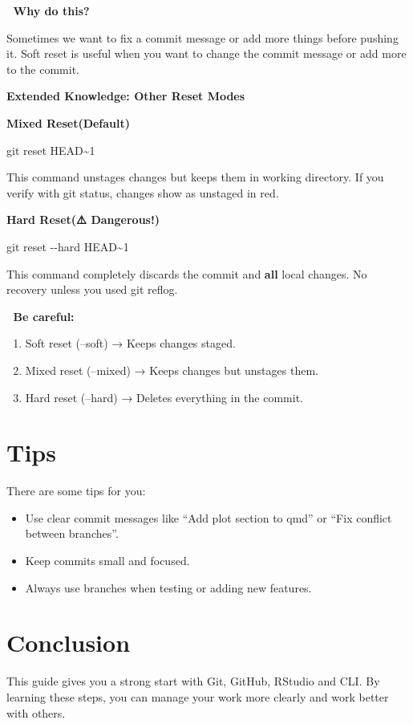 \documentclass[
  11pt,
]{article}
\newenvironment{Shaded}{\begin{snugshade}}{\end{snugshade}}
\newcommand{\AttributeTok}[1]{\textcolor[rgb]{0.40,0.45,0.13}{#1}}
\newcommand{\FunctionTok}[1]{\textcolor[rgb]{0.28,0.35,0.67}{#1}}
\newcommand{\NormalTok}[1]{\textcolor[rgb]{0.00,0.23,0.31}{#1}}
\providecommand{\tightlist}{%
  \setlength{\itemsep}{0pt}\setlength{\parskip}{0pt}}\usepackage{longtable,booktabs,array}
\begin{document}
🧠 \textbf{Why do this?}

Sometimes we want to fix a commit message or add more things before
pushing it. Soft reset is useful when you want to change the commit
message or add more to the commit.

\textbf{Extended Knowledge: Other Reset Modes}

\textbf{Mixed Reset(Default)}

\begin{Shaded}
\begin{Highlighting}[]
\FunctionTok{git}\NormalTok{ reset HEAD\textasciitilde{}1}
\end{Highlighting}
\end{Shaded}

This command unstages changes but keeps them in working directory. If
you verify with git status, changes show as unstaged in red.

\textbf{Hard Reset(⚠️ Dangerous!)}

\begin{Shaded}
\begin{Highlighting}[]
\FunctionTok{git}\NormalTok{ reset }\AttributeTok{{-}{-}hard}\NormalTok{ HEAD\textasciitilde{}1}
\end{Highlighting}
\end{Shaded}

This command completely discards the commit and \textbf{all} local
changes. No recovery unless you used git reflog.

🧠 \textbf{Be careful:}

\begin{enumerate}
\def\labelenumi{\arabic{enumi}.}
\tightlist
\item
  Soft reset (--soft) → Keeps changes staged.
\item
  Mixed reset (--mixed) → Keeps changes but unstages them.
\item
  Hard reset (--hard) → Deletes everything in the commit.
\end{enumerate}

\section{Tips}\label{tips}

There are some tips for you:

\begin{itemize}
\item
  Use clear commit messages like ``Add plot section to qmd'' or ``Fix
  conflict between branches''.
\item
  Keep commits small and focused.
\item
  Always use branches when testing or adding new features.
\end{itemize}

\section{Conclusion}\label{conclusion}

This guide gives you a strong start with Git, GitHub, RStudio and CLI.
By learning these steps, you can manage your work more clearly and work
better with others.
\end{document}

